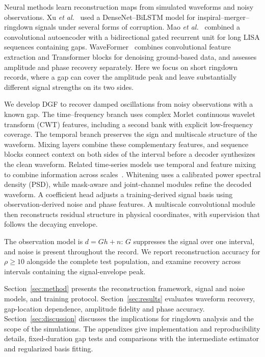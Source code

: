 \documentclass[10pt,prd,aps,a4paper,twocolumn,superscriptaddress,nofootinbib,floatfix]{revtex4-2}
\begin{document}
Neural methods learn reconstruction maps from simulated waveforms and noisy observations. Xu \textit{et al.}~\cite{Xu_2024} used a DenseNet--BiLSTM model for inspiral--merger--ringdown signals under several forms of corruption. Mao \textit{et al.}~\cite{Mao:2025cae} combined a convolutional autoencoder with a bidirectional gated recurrent unit for long LISA sequences containing gaps. WaveFormer~\cite{Wang:2024waveformer} combines convolutional feature extraction and Transformer blocks for denoising ground-based data, and assesses amplitude and phase recovery separately. Here we focus on short ringdown records, where a gap can cover the amplitude peak and leave substantially different signal strengths on its two sides.

We develop DGF to recover damped oscillations from noisy observations with a known gap. The time--frequency branch uses complex Morlet continuous wavelet transform (CWT) features, including a second bank with explicit low-frequency coverage. The temporal branch preserves the sign and multiscale structure of the waveform. Mixing layers combine these complementary features, and sequence blocks connect context on both sides of the interval before a decoder synthesizes the clean waveform. Related time-series models use temporal and feature mixing to combine information across scales~\cite{TSMixer2023,TimeMixer2024}. Whitening uses a calibrated power spectral density (PSD), while mask-aware and joint-channel modules refine the decoded waveform. A coefficient head adjusts a training-derived signal basis using observation-derived noise and phase features. A multiscale convolutional module then reconstructs residual structure in physical coordinates, with supervision that follows the decaying envelope.

The observation model is $d=Gh+n$: $G$ suppresses the signal over one interval, and noise is present throughout the record. We report reconstruction accuracy for $\rho\ge10$ alongside the complete test population, and examine recovery across intervals containing the signal-envelope peak.

Section~\ref{sec:method} presents the reconstruction framework, signal and noise models, and training protocol. Section~\ref{sec:results} evaluates waveform recovery, gap-location dependence, amplitude fidelity and phase accuracy. Section~\ref{sec:discussion} discusses the implications for ringdown analysis and the scope of the simulations. The appendixes give implementation and reproducibility details, fixed-duration gap tests and comparisons with the intermediate estimator and regularized basis fitting.
\end{document}
